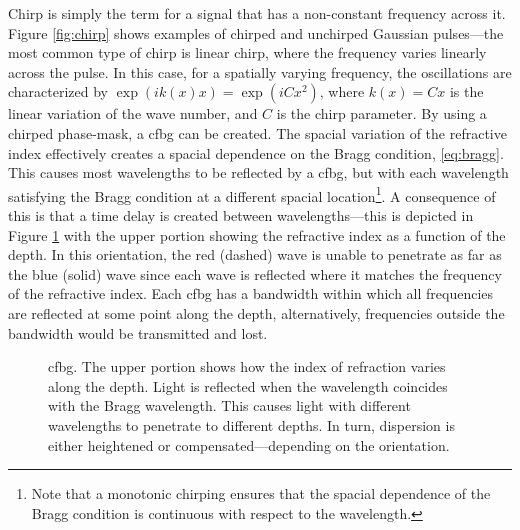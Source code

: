 Chirp is simply the term for a signal that has a non-constant frequency across it. Figure \ref{fig:chirp} shows examples of chirped and unchirped Gaussian pulses---the most common type of chirp is linear chirp, where the frequency varies linearly across the pulse. In this case, for a spatially varying frequency, the oscillations are characterized by $\exp \left( i k(x) x \right) = \exp \left( i C x^2 \right)$, where $k(x) = Cx$ is the linear variation of the wave number, and $C$ is the chirp parameter. By using a chirped phase-mask, a \gls{cfbg} can be created. The spacial variation of the refractive index effectively creates a spacial dependence on the Bragg condition, \eqref{eq:bragg}. This causes most wavelengths to be reflected by a \gls{cfbg}, but with each wavelength satisfying the Bragg condition at a different spacial location\footnote{Note that a monotonic chirping ensures that the spacial dependence of the Bragg condition is continuous with respect to the wavelength.}. A consequence of this is that a time delay is created between wavelengths---this is depicted in Figure \ref{fig:cfbg} with the upper portion showing  the refractive index as a function of the depth. In this orientation, the red (dashed) wave is unable to penetrate as far as the blue (solid) wave since each wave is reflected where it matches the frequency of the refractive index. Each \gls{cfbg} has a bandwidth within which all frequencies are reflected at some point along the depth, alternatively, frequencies outside the bandwidth would be transmitted and lost. \\

\begin{figure}[tbp]
\centering

\caption[Chirped fibre Bragg grating.]{\Acrlong{cfbg}. The upper portion shows how the index of refraction varies along the depth. Light is reflected when the wavelength coincides with the Bragg wavelength. This causes light with different wavelengths to penetrate to different depths. In turn, dispersion is either heightened or compensated---depending on the orientation.}
\label{fig:cfbg}
\end{figure}

